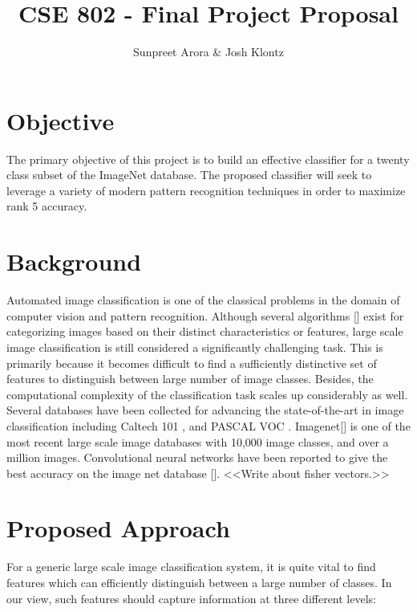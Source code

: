 \documentclass[12pt]{article}
\begin{document}
 
\title{CSE 802 - Final Project Proposal}
\author{Sunpreet Arora \& Josh Klontz\\
}
 
\maketitle

\section{Objective}
The primary objective of this project is to build an effective classifier for a twenty class subset of the ImageNet \cite{imagenet} database. 
The proposed classifier will seek to leverage a variety of modern pattern recognition techniques in order to maximize rank 5 accuracy.

\section{Background}
Automated image classification is one of the classical problems in the domain of computer vision and pattern recognition. Although several algorithms [] exist for categorizing images based on their distinct characteristics or features, large scale image classification is still considered a significantly challenging task. This is primarily because it becomes difficult to find a sufficiently distinctive set of features to distinguish between large number of image classes. Besides, the computational complexity of the classification task scales up considerably as well.\\
Several databases have been collected for advancing the state-of-the-art in image classification including Caltech 101 \cite{caltech101}, and PASCAL VOC \cite{pascal09}. Imagenet[] is one of the most recent large scale image databases with 10,000 image classes, and over a million images. Convolutional neural networks have been reported to give the best accuracy on the image net database []. <<Write about fisher vectors.>>


\section{Proposed Approach}
For a generic large scale image classification system, it is quite vital to find features which can efficiently distinguish between a large number of classes. In our view, such features should capture information at three different levels:
\end{document}
